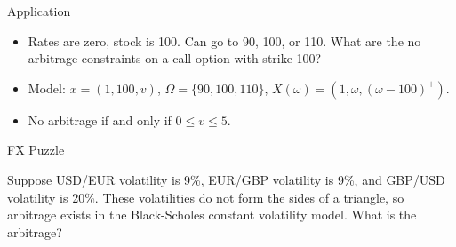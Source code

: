 \documentclass[fleqn]{amsart}
\begin{document}
\begin{section}{Application}

\begin{itemize}

\item Rates are zero, stock is 100. Can go to 90, 100, or 110.  What are
the no arbitrage constraints on a call option with strike 100?

\item Model: $x = (1, 100, v)$, $\Omega = \{90, 100, 110\}$,
$X(\omega) = (1, \omega, (\omega - 100)^+)$. 

\item No arbitrage if and only if $0\le v\le 5$.

\end{itemize}

\end{section}

\begin{section}{FX Puzzle}

Suppose USD/EUR volatility is 9\%, EUR/GBP volatility is
9\%, and GBP/USD volatility is 20\%. These volatilities
do not form the sides of a triangle, so arbitrage exists
in the Black-Scholes constant volatility model.
What is the arbitrage?

\end{section}
\end{document}

